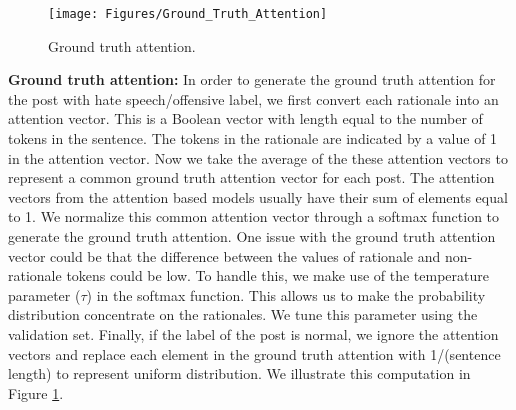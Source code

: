 \documentclass[letterpaper]{article} \usepackage{aaai21}  \usepackage{times}  \usepackage{helvet} \usepackage{courier}  \usepackage[hyphens]{url}  \usepackage{graphicx} \urlstyle{rm} \def\UrlFont{\rm}  \usepackage{natbib}  \usepackage{caption}
\begin{document}
\begin{figure}[t]
    \centering
    \texttt{[image: Figures/Ground\_Truth\_Attention]}
    \caption{Ground truth attention.}
    \label{fig:ground_truth_attention}
\end{figure}

\noindent\textbf{Ground truth attention:} In order to generate the ground truth attention for the post with hate speech/offensive label, we first convert each rationale into an attention vector. This is a Boolean vector with length equal to the number of tokens in the sentence. The tokens in the rationale are indicated by a value of 1 in the attention vector. Now we take the average of the these attention vectors to represent a common ground truth attention vector for each post. The attention vectors from the attention based models usually have their sum of elements equal to 1. We normalize this common attention vector through a softmax function to generate the ground truth attention. One issue with the ground truth attention vector could be that the difference between the values of rationale and non-rationale tokens could be low. To handle this, we make use of the temperature parameter ($\tau$) in the softmax function. This allows us to make the probability distribution concentrate on the rationales. We tune this parameter using the validation set.
Finally, if the label of the post is normal, we ignore the attention vectors and replace each element in the ground truth attention with 1/(sentence length) to represent uniform distribution. We illustrate this computation in Figure \ref{fig:ground_truth_attention}.
\end{document}
